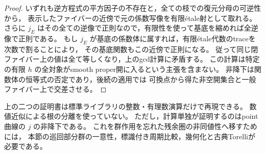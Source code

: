 \begin{proof}
いずれも逆方程式の平方因子の不存在と，全ての枝での復元分母の可逆性から，
表示したファイバーの近傍で元の係数写像を有限\'{e}tale射として取れる。
さらに $j_E$ はその全ての逆像で正則なので，有限性を使って基底を縮めれば全逆像で正則である。
もし $j_E$ が基底の係数体に属すれば，有限\'{e}tale代数のtraceを次数で割ることにより，
その基底関数もこの近傍で正則になる。
従って同じ閉ファイバー上の値は全て等しくなり，上のgcd計算に矛盾する。
この計算は特定の有限 $h$ の全対象がsmooth proper開に入るという主張を含まない。
非降下は関数体の恒等式の否定であり，後続の適用では
可換点から得た非空開集合と一般ファイバー上で交差させる。
\end{proof}

\begin{remark}[計算の範囲]
上の二つの証明書は標準ライブラリの整数・有理数演算だけで再現できる。
数値近似による根の分離を使っていない。
ただし，計算単独が証明するのはpoint曲線の $j$ の非降下である。
これを群作用を忘れた残余圏の非同値性へ移すためには，
本節の巡回部分群の一意性，標識付き周期比較，幾何化と古典Torelliが必要である。
\end{remark}

